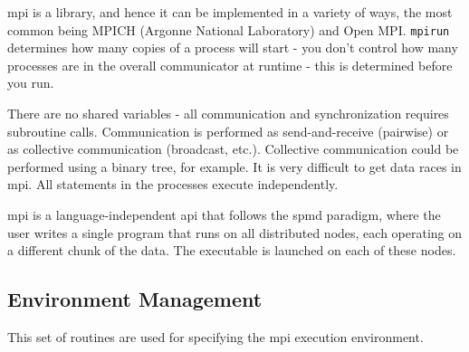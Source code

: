 \documentclass[10pt]{article}
\begin{document}
\begin{flushleft}
\gls{mpi} is a library, and hence it can be implemented in a variety of ways, the most common being MPICH (Argonne National Laboratory) and Open MPI. {\tt mpirun} determines how many copies of a process will start - you don't control how many processes are in the overall communicator at runtime - this is determined before you run. 

There are no shared variables - all communication and synchronization requires subroutine calls. Communication is performed as send-and-receive (pairwise) or as collective communication (broadcast, etc.). Collective communication could be performed using a binary tree, for example. It is very difficult to get data races in \gls{mpi}. All statements in the processes execute independently. 

\gls{mpi} is a language-independent \gls{api} that follows the \gls{spmd} paradigm, where the user writes a single program that runs on all distributed nodes, each operating on a different chunk of the data. The executable is launched on each of these nodes. 

\subsection{Environment Management}

This set of routines are used for specifying the \gls{mpi} execution environment. 


\end{flushleft}
\end{document}
